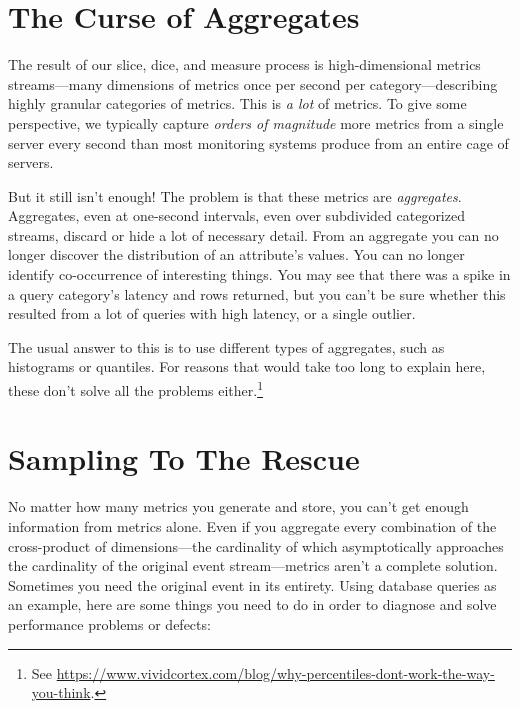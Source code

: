 \documentclass{vivid_layout}
\begin{document}
\section{The Curse of Aggregates}

The result of our slice, dice, and measure process is high-dimensional metrics
streams---many dimensions of metrics once per second per category---describing
highly granular categories of metrics. This is \emph{a lot} of metrics. To give
some perspective, we typically capture \emph{orders of magnitude} more metrics
from a single server every second than most monitoring systems produce from an
entire cage of servers.

But it still isn't enough! The problem is that these metrics are
\emph{aggregates}. Aggregates, even at one-second intervals, even over
subdivided categorized streams, discard or hide a lot of necessary detail. From an
aggregate you can no longer discover the distribution of an attribute's values.
You can no longer identify co-occurrence of interesting things. You may see that
there was a spike in a query category's latency and rows returned, but you can't
be sure whether this resulted from a lot of queries with high latency, or a
single outlier.

The usual answer to this is to use different types of aggregates, such as
histograms or quantiles. For reasons that would take too long to explain here,
these don't solve all the problems either.\footnote{See
\href{https://www.vividcortex.com/blog/why-percentiles-dont-work-the-way-you-think}{https://www.vividcortex.com/blog/why-percentiles-dont-work-the-way-you-think}.}

\section{Sampling To The Rescue}

No matter how many metrics you generate and store, you can't get enough
information from metrics alone. Even if you aggregate every combination of the
cross-product of dimensions---the cardinality of which asymptotically approaches
the cardinality of the original event stream---metrics aren't a complete
solution. Sometimes you need the original event in its entirety. Using database
queries as an example, here are some things you need to do in order to diagnose
and solve performance problems or defects:
\end{document}
